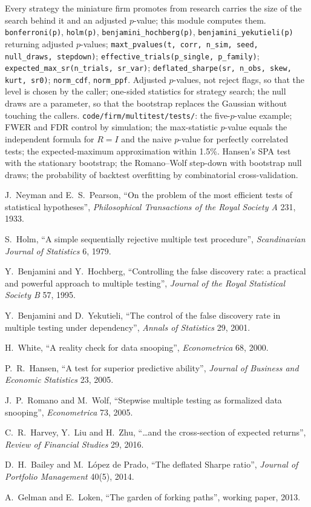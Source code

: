 \begin{build}
 Every strategy the miniature firm promotes from research carries the size of the search behind it and an adjusted
$p$-value; this module computes them.
 \texttt{bonferroni(p)}, \texttt{holm(p)}, \texttt{benjamini\_hochberg(p)}, \texttt{benjamini\_yekutieli(p)} returning
adjusted $p$-values; \texttt{maxt\_pvalues(t, corr, n\_sim, seed, null\_draws, stepdown)}; \texttt{effective\_trials(p\_single,
p\_family)}; \texttt{expected\_max\_sr(n\_trials, sr\_var)}; \texttt{deflated\_sharpe(sr, n\_obs, skew, kurt, sr0)}; \texttt{norm\_cdf},
\texttt{norm\_ppf}.
 Adjusted $p$-values, not reject flags, so that the level is chosen by the caller; one-sided statistics for strategy
search; the null draws are a parameter, so that the bootstrap replaces the Gaussian without touching the callers.
 \texttt{code/firm/multitest/tests/}: the five-$p$-value example; FWER and FDR control by simulation; the
max-statistic $p$-value equals the independent formula for $R = I$ and the naive $p$-value for perfectly correlated tests; the
expected-maximum approximation within 1.5\%.
 Hansen's SPA test with the stationary bootstrap; the Romano--Wolf step-down with bootstrap null draws; the
probability of backtest overfitting by combinatorial cross-validation.
\end{build}

\begin{omsources}
\item J.~Neyman and E.~S.~Pearson, ``On the problem of the most efficient tests of statistical hypotheses'', \emph{Philosophical
Transactions of the Royal Society A} 231, 1933.
\item S.~Holm, ``A simple sequentially rejective multiple test procedure'', \emph{Scandinavian Journal of Statistics} 6, 1979.
\item Y.~Benjamini and Y.~Hochberg, ``Controlling the false discovery rate: a practical and powerful approach to multiple testing'',
\emph{Journal of the Royal Statistical Society B} 57, 1995.
\item Y.~Benjamini and D.~Yekutieli, ``The control of the false discovery rate in multiple testing under dependency'', \emph{Annals of
Statistics} 29, 2001.
\item H.~White, ``A reality check for data snooping'', \emph{Econometrica} 68, 2000.
\item P.~R.~Hansen, ``A test for superior predictive ability'', \emph{Journal of Business and Economic Statistics} 23, 2005.
\item J.~P.~Romano and M.~Wolf, ``Stepwise multiple testing as formalized data snooping'', \emph{Econometrica} 73, 2005.
\item C.~R.~Harvey, Y.~Liu and H.~Zhu, ``\dots and the cross-section of expected returns'', \emph{Review of Financial Studies} 29, 2016.
\item D.~H.~Bailey and M.~López de Prado, ``The deflated Sharpe ratio'', \emph{Journal of Portfolio Management} 40(5), 2014.
\item A.~Gelman and E.~Loken, ``The garden of forking paths'', working paper, 2013.
\end{omsources}

